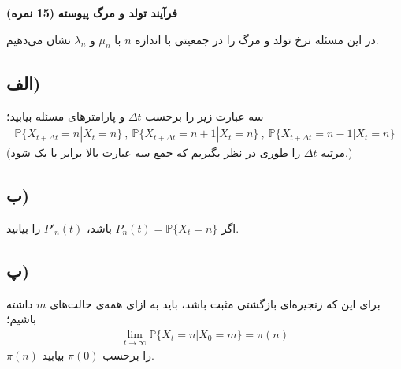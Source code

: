 \Large \textbf{فرآیند تولد و مرگ پیوسته}
\large \textbf{(15 نمره)}

\normalsize \vspace{0.5cm}

در این مسئله نرخ تولد و مرگ را در جمعیتی با اندازه 
$n$ با 
$\mu_n$ و $\lambda_n$ نشان می‌دهیم.
\subsection*{الف)}
سه عبارت زیر را برحسب 
$\Delta t$ و پارامترهای مسئله بیابید؛
\begin{align*}
    \mathbb{P}\{ X_{t+\Delta t}=n|X_t=n\}\ , \ \mathbb{P}\{ X_{t+\Delta t}=n+1|X_t=n\}\ , \ \mathbb{P}\{ X_{t+\Delta t}=n-1|X_t=n\}
\end{align*}
 (مرتبه 
 $\Delta t$ را طوری در نظر بگیریم که جمع سه عبارت بالا برابر با یک شود.)

\subsection*{ب)}
اگر 
$P_n(t)=\mathbb{P}\{X_t=n\}$ باشد، 
$P'_n(t)$ را بیابید.
\subsection*{پ)}
برای این که زنجیره‌ای بازگشتی مثبت باشد، باید به ازای همه‌ی حالت‌های 
$m$
داشته باشیم؛
\begin{align*}
    \lim_{t\rightarrow \infty}\mathbb{P}\{X_t=n|X_0=m\}=\pi(n)
\end{align*}
$\pi(n)$ را برحسب 
$\pi(0)$ بیابید.
